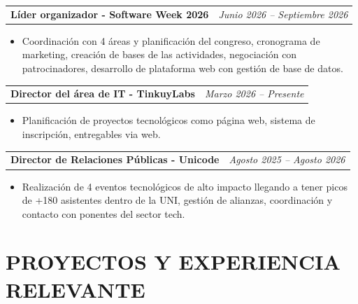 \documentclass[a4paper,11pt]{article}
\begin{document}
\noindent
\begin{tabularx}{\textwidth}{@{}X r@{}}
\textbf{Líder organizador - Software Week 2026} & \textit{\small Junio 2026 -- Septiembre 2026}
\end{tabularx}

\begin{itemize}[leftmargin=1.5em, nosep]
\item Coordinación con 4 áreas y planificación del congreso, cronograma de marketing, creación de bases de las actividades, negociación con patrocinadores, desarrollo de plataforma web con gestión de base de datos.
\end{itemize}

\vspace{3mm}

\noindent
\begin{tabularx}{\textwidth}{@{}X r@{}}
\textbf{Director del área de IT - TinkuyLabs} & \textit{\small Marzo 2026 -- Presente}
\end{tabularx}

\begin{itemize}[leftmargin=1.5em, nosep]
\item Planificación de proyectos tecnológicos como página web, sistema de inscripción, entregables via web.
\end{itemize}

\vspace{3mm}

\noindent
\begin{tabularx}{\textwidth}{@{}X r@{}}
\textbf{Director de Relaciones Públicas - Unicode} & \textit{\small Agosto 2025 -- Agosto 2026}
\end{tabularx}

\begin{itemize}[leftmargin=1.5em, nosep]
\item Realización de 4 eventos tecnológicos de alto impacto llegando a tener picos de +180 asistentes dentro de la UNI, gestión de alianzas, coordinación y contacto con ponentes del sector tech. 
\end{itemize}

\vspace{2mm}



\section{\textbf{PROYECTOS Y EXPERIENCIA RELEVANTE}}
\end{document}
